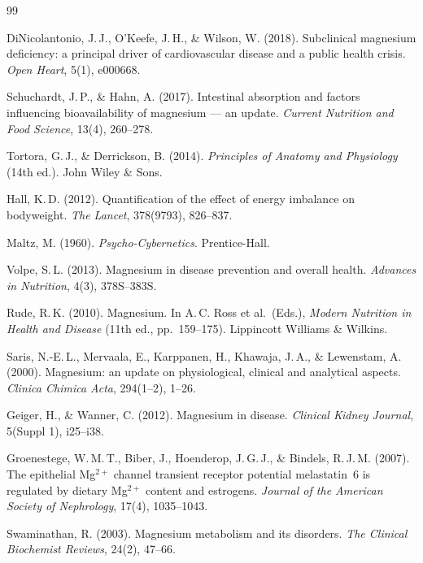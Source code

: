 ﻿\documentclass[12pt,a4paper]{article}
\theoremstyle{plain}
\theoremstyle{definition}
\theoremstyle{remark}
\begin{document}
\begin{thebibliography}{99}

DiNicolantonio, J.\,J., O'Keefe, J.\,H., \& Wilson, W. (2018).
Subclinical magnesium deficiency: a principal driver of cardiovascular disease
and a public health crisis.
\textit{Open Heart}, 5(1), e000668.

Schuchardt, J.\,P., \& Hahn, A. (2017).
Intestinal absorption and factors influencing bioavailability of magnesium ---
an update.
\textit{Current Nutrition and Food Science}, 13(4), 260--278.

Tortora, G.\,J., \& Derrickson, B. (2014).
\textit{Principles of Anatomy and Physiology} (14th ed.).
John Wiley \& Sons.

Hall, K.\,D. (2012).
Quantification of the effect of energy imbalance on bodyweight.
\textit{The Lancet}, 378(9793), 826--837.

Maltz, M. (1960).
\textit{Psycho-Cybernetics}.
Prentice-Hall.

Volpe, S.\,L. (2013).
Magnesium in disease prevention and overall health.
\textit{Advances in Nutrition}, 4(3), 378S--383S.

Rude, R.\,K. (2010).
Magnesium.
In A.\,C. Ross et al.\ (Eds.), \textit{Modern Nutrition in Health and
Disease} (11th ed., pp.\ 159--175). Lippincott Williams \& Wilkins.

Saris, N.-E.\,L., Mervaala, E., Karppanen, H., Khawaja, J.\,A., \&
Lewenstam, A. (2000).
Magnesium: an update on physiological, clinical and analytical aspects.
\textit{Clinica Chimica Acta}, 294(1--2), 1--26.

Geiger, H., \& Wanner, C. (2012).
Magnesium in disease.
\textit{Clinical Kidney Journal}, 5(Suppl 1), i25--i38.

Groenestege, W.\,M.\,T., Biber, J., Hoenderop, J.\,G.\,J., \&
Bindels, R.\,J.\,M. (2007).
The epithelial Mg$^{2+}$ channel transient receptor potential melastatin~6
is regulated by dietary Mg$^{2+}$ content and estrogens.
\textit{Journal of the American Society of Nephrology}, 17(4), 1035--1043.

Swaminathan, R. (2003).
Magnesium metabolism and its disorders.
\textit{The Clinical Biochemist Reviews}, 24(2), 47--66.


\end{thebibliography}
\end{document}
